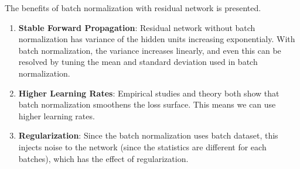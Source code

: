 \documentclass{article}
\begin{document}
        The benefits of batch normalization with residual network is presented.
        \begin{enumerate}
            \item \textbf{Stable Forward Propagation}: Residual network without batch normalization has variance of the hidden units
                increasing exponentialy. With batch normalization, the variance increases linearly, and even this can be resolved
                by tuning the mean and standard deviation used in batch normalization.
            \item \textbf{Higher Learning Rates}: Empirical studies and theory both show that batch normalization
                smoothens the loss surface. This means we can use higher learning rates.
            \item \textbf{Regularization}: Since the batch normalization uses batch dataset, this injects noise to the network
                (since the statistics are different for each batches),
                which has the effect of regularization.
        \end{enumerate}
\end{document}
